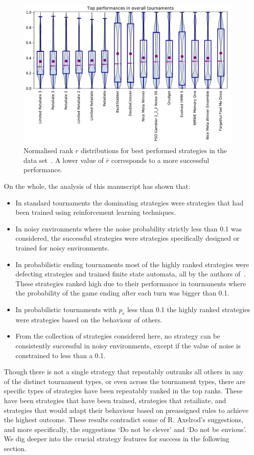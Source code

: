\documentclass{article}
\begin{document}
\begin{figure}[!htbp]
        \centering
        \includegraphics[width=.65\textwidth]{../images/performance_merged.pdf}
        \caption{Normalised rank \(r\) distributions for best performed strategies in the data set~\cite{data}.
        A lower value of \(\bar{r}\) corresponds to a more successful
        performance.}
        \label{fig:overall_results}
\end{figure}

On the whole, the analysis of this manuscript has shown that:

\begin{itemize}
    \item In standard tournaments the dominating strategies were
    strategies that had been trained using reinforcement learning techniques.
    \item In noisy environments where the noise probability strictly less than
    0.1 was considered, the successful strategies were strategies specifically
    designed or trained for noisy environments.
    \item In probabilistic ending tournaments most of the highly ranked
    strategies were defecting strategies and trained finite state automata, all
    by the authors of~\cite{Ashlock2006, Ashlock2014}. These strategies ranked
    high due to their performance in tournaments where the probability of the
    game ending after each turn was bigger than 0.1.
    \item In probabilistic tournaments with \(p_e\) less than 0.1 the highly
    ranked strategies were strategies based on the behaviour of others.
    \item From the collection of strategies considered here,  no strategy can be
    consistently successful in noisy environments, except if the value of noise
    is constrained to less than a 0.1.
\end{itemize}

Though there is not a single strategy that repeatably outranks all others in any
of the distinct tournament types, or even across the tournament types, there
are specific types of strategies have been repeatably ranked in the top ranks.
These have been strategies that have been trained, strategies that retailiate,
and strategies that would adapt their behaviour based on preassigned rules
to achieve the highest outcome. These results contradict some of R. Axelrod's suggestions,
and more specifically, the suggestions `Do not be clever' and `Do not be envious'.
We dig deeper into the crucial strategy features for success in the following section.
\end{document}
